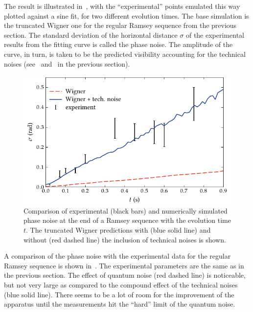 The result is illustrated in~, with the ``experimental'' points emulated this way plotted against a sine fit, for two different evolution times.
The base simulation is the truncated Wigner one for the regular Ramsey sequence from the previous section.
The standard deviation of the horizontal distance $\sigma$ of the experimental results from the fitting curve is called the phase noise.
The amplitude of the curve, in turn, is taken to be the predicted visibility accounting for the technical noises (see~ and~ in the previous section).

\begin{figure}
    \centerline{\includegraphics{figures_generated/bec_noise/ramsey_noise.pdf}}

    \caption[Experimental and numerically simulated phase noise in Ramsey sequence]{
    Comparison of experimental (black bars) and numerically simulated phase noise at the end of a Ramsey sequence with the evolution time $t$.
    The truncated Wigner predictions with (blue solid line) and without (red dashed line) the inclusion of technical noises is shown.}%

    \label{fig:bec-noise:phase-noise:ramsey-phnoise}
\end{figure}

A comparison of the phase noise with the experimental data for the regular Ramsey sequence is shown in~.
The experimental parameters are the same as in the previous section.
The effect of quantum noise (red dashed line) is noticeable, but not very large as compared to the compound effect of the technical noises (blue solid line).
There seems to be a lot of room for the improvement of the apparatus until the measurements hit the ``hard'' limit of the quantum noise.

